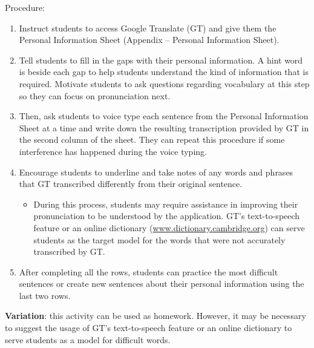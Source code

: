 \documentclass[english]{textolivre}
\begin{document}
\vspace{3ex}
Procedure:
\begin{enumerate}
    \item Instruct students to access Google Translate (GT) and give them the Personal Information Sheet (Appendix – Personal Information Sheet).
    \item Tell students to fill in the gaps with their personal information. A hint word is beside each gap to help students understand the kind of information that is required. Motivate students to ask questions regarding vocabulary at this step so they can focus on pronunciation next. 
    \item Then, ask students to voice type each sentence from the Personal Information Sheet at a time and write down the resulting transcription provided by GT in the second column of the sheet. They can repeat this procedure if some interference has happened during the voice typing.
    \item Encourage students to underline and take notes of any words and phrases that GT transcribed differently from their original sentence.
    \begin{itemize}
        \item During this process, students may require assistance in improving their pronunciation to be understood by the application. GT’s text-to-speech feature or an online dictionary (\url{www.dictionary.cambridge.org}) can serve students as the target model for the words that were not accurately transcribed by GT.
    \end{itemize}
    \item After completing all the rows, students can practice the most difficult sentences or create new sentences about their personal information using the last two rows.
\end{enumerate}


\textbf{Variation}: this activity can be used as homework. However, it may be necessary to suggest the usage of GT’s text-to-speech feature or an online dictionary to serve students as a model for difficult words.


\end{document}
